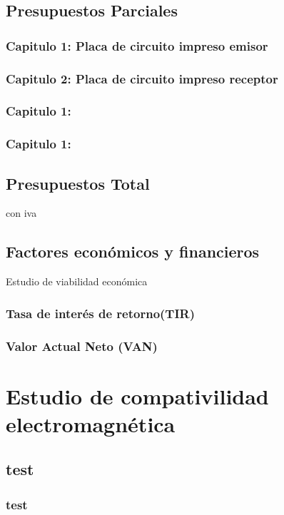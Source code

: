 \documentclass[a4paper ,12pt, onecolumn]{article}
\begin{document}
    \subsection{Presupuestos Parciales}
        \subsubsection{Capitulo 1: Placa de circuito impreso emisor}
        \subsubsection{Capitulo 2: Placa de circuito impreso receptor}
        \subsubsection{Capitulo 1: }
        \subsubsection{Capitulo 1: }
    \subsection{Presupuestos Total}
        con iva
    \subsection{Factores económicos y financieros}
    Estudio de viabilidad económica
        \subsubsection{Tasa de interés de retorno(TIR)}
        \subsubsection{Valor Actual Neto (VAN)}

\section{Estudio de compativilidad electromagnética}
\subsection{test}
\subsubsection{test}
\end{document}
